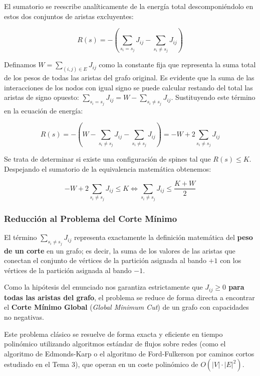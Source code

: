 \documentclass[12pt]{book} %
\begin{document}
El sumatorio se reescribe analíticamente de la energía total
descomponiéndolo en estos dos conjuntos de aristas excluyentes:

\[R(s) = -\left( \sum_{s_i = s_j} J_{ij} - \sum_{s_i \neq s_j} J_{ij} \right)\]

Definamos \(W = \sum_{(i,j)\in E} J_{ij}\) como la constante fija que
representa la suma total de los pesos de todas las aristas del grafo
original. Es evidente que la suma de las interacciones de los nodos con
igual signo se puede calcular restando del total las aristas de signo
opuesto: \(\sum_{s_i = s_j} J_{ij} = W - \sum_{s_i \neq s_j} J_{ij}\).
Sustituyendo este término en la ecuación de energía:

\[R(s) = -\left( W - \sum_{s_i \neq s_j} J_{ij} - \sum_{s_i \neq s_j} J_{ij} \right) = -W + 2 \sum_{s_i \neq s_j} J_{ij}\]

Se trata de determinar si existe una configuración de spines tal que
\(R(s) \le K\). Despejando el sumatorio de la equivalencia matemática
obtenemos:

\[-W + 2 \sum_{s_i \neq s_j} J_{ij} \le K \iff \sum_{s_i \neq s_j} J_{ij} \le \frac{K + W}{2}\]

\hypertarget{reducciuxf3n-al-problema-del-corte-muxednimo}{%
\subsubsection{Reducción al Problema del Corte
Mínimo}\label{reducciuxf3n-al-problema-del-corte-muxednimo}}

El término \(\sum_{s_i \neq s_j} J_{ij}\) representa exactamente la
definición matemática del \textbf{peso de un corte} en un grafo; es
decir, la suma de los valores de las aristas que conectan el conjunto de
vértices de la partición asignada al bando \(+1\) con los vértices de la
partición asignada al bando \(-1\).

Como la hipótesis del enunciado nos garantiza estrictamente que
\textbf{\(J_{ij} \ge 0\) para todas las aristas del grafo}, el problema
se reduce de forma directa a encontrar el \textbf{Corte Mínimo Global}
(\emph{Global Minimum Cut}) de un grafo con capacidades no negativas.

Este problema clásico se resuelve de forma exacta y eficiente en tiempo
polinómico utilizando algoritmos estándar de flujos sobre redes (como el
algoritmo de Edmonds-Karp o el algoritmo de Ford-Fulkerson por caminos
cortos estudiado en el Tema 3), que operan en un coste polinómico de
\(O(|V| \cdot |E|^2)\).
\end{document}
